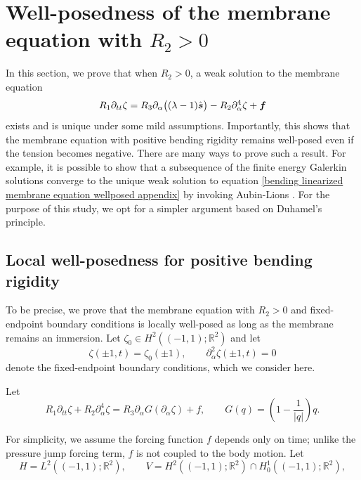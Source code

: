 \documentclass{article}[12pt]
\theoremstyle{Theorem}
\begin{document}
\section{Well-posedness of the membrane equation with $R_2 >0$}
\label{well-posedness of the membrane equation appendix}
In this section, we prove that when $R_2 > 0$, a weak solution to the 
membrane equation 
\begin{equation}
     R_1\partial_{tt}\zeta  = R_3\partial_\alpha\big( (\lambda-1)\hat{\boldsymbol{s}}\big)- R_2\partial_{\alpha}^4\zeta \\ +\boldsymbol{f}
     \label{bending linearized membrane equation wellposed appendix}
\end{equation}
exists and is unique under some mild assumptions. Importantly, this shows that the membrane equation with positive bending rigidity remains well-posed even if the tension becomes negative. There are many ways to prove such a result. For example, it is possible to show that a subsequence of the finite energy Galerkin solutions converge to the unique weak solution to equation \eqref{bending linearized membrane equation wellposed appendix} by invoking Aubin-Lions \cite{boyer2012mathematical}\cite[Ch.~III, \S2.2, Thm.~2.1]{temam1979navier}. 
For the purpose of this study, we opt for a simpler argument based on Duhamel's principle.
\newline

\subsection{Local well-posedness for positive bending rigidity}

To be precise, we prove that the membrane equation with \(R_2>0\) and fixed-endpoint boundary conditions is locally well-posed as long as the membrane remains an immersion. Let $\zeta_0 \in H^2((-1,1); \mathbb{R}^2)$ and let
$$
    \zeta(\pm1,t)=\zeta_0(\pm1),
    \qquad
    \partial_\alpha^2\zeta(\pm1,t)=0
$$
denote the fixed-endpoint boundary conditions, which we consider here.
\newline

Let 
\begin{equation}
R_1\partial_{tt}\zeta+R_2\partial_\alpha^4\zeta
=
R_3\partial_\alpha G(\partial_\alpha\zeta)+f,
\qquad
G(q)=\left(1-\frac{1}{|q|}\right)q.
\label{positive-R2-evolution}
\end{equation}

For simplicity, we assume the forcing function $f$ depends only on time; unlike the pressure jump forcing term, $f$ is not coupled to the body motion.
Let
$$
    H=L^2((-1,1);\mathbb R^2),
    \qquad
    V=H^2((-1,1);\mathbb R^2)\cap H_0^1((-1,1);\mathbb R^2),
$$
\end{document}
